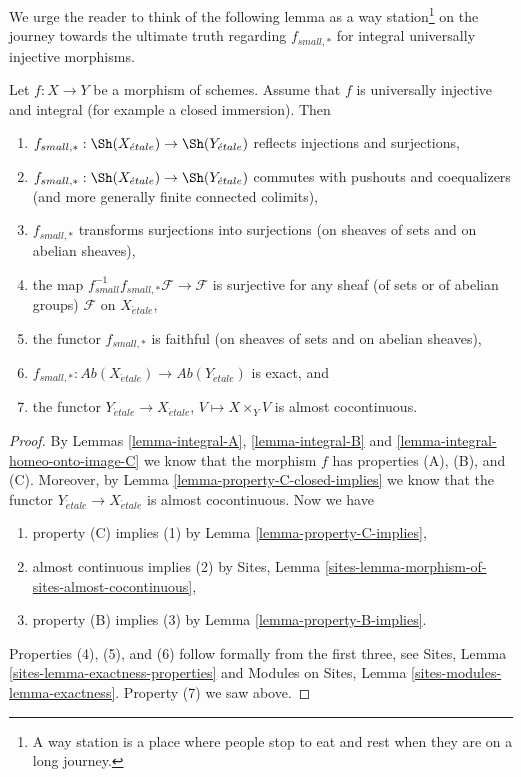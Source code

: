 \noindent
We urge the reader to think of the following lemma as a
way station\footnote{A way station is a place where people stop to eat
and rest when they are on a long journey.} on the journey towards the
ultimate truth regarding $f_{small, *}$ for integral universally injective
morphisms.

\begin{lemma}
\label{lemma-integral-universally-injective}
Let $f : X \to Y$ be a morphism of schemes. Assume that $f$ is
universally injective and integral (for example a closed immersion).
Then
\begin{enumerate}
\item
$f_{small, *} :
\Sh(X_{\acute{e}tale})
\to
\Sh(Y_{\acute{e}tale})$
reflects injections and surjections,
\item
$f_{small, *} :
\Sh(X_{\acute{e}tale})
\to
\Sh(Y_{\acute{e}tale})$
commutes with pushouts and coequalizers (and more generally
finite connected colimits),
\item $f_{small, *}$ transforms surjections into surjections (on sheaves
of sets and on abelian sheaves),
\item the map
$f_{small}^{-1}f_{small, *}\mathcal{F} \to \mathcal{F}$
is surjective for any sheaf (of sets or of abelian groups)
$\mathcal{F}$ on $X_{\acute{e}tale}$,
\item the functor $f_{small, *}$ is faithful (on sheaves of sets and
on abelian sheaves),
\item
$f_{small, *} :
\textit{Ab}(X_{\acute{e}tale})
\to
\textit{Ab}(Y_{\acute{e}tale})$
is exact, and
\item the functor
$Y_{\acute{e}tale} \to X_{\acute{e}tale}$, $V \mapsto X \times_Y V$ is
almost cocontinuous.
\end{enumerate}
\end{lemma}

\begin{proof}
By
Lemmas \ref{lemma-integral-A},
\ref{lemma-integral-B} and
\ref{lemma-integral-homeo-onto-image-C}
we know that the morphism $f$ has properties (A), (B), and (C).
Moreover, by
Lemma \ref{lemma-property-C-closed-implies}
we know that the functor $Y_{\acute{e}tale} \to X_{\acute{e}tale}$ is
almost cocontinuous. Now we have
\begin{enumerate}
\item property (C) implies (1) by
Lemma \ref{lemma-property-C-implies},
\item almost continuous implies (2) by
Sites, Lemma \ref{sites-lemma-morphism-of-sites-almost-cocontinuous},
\item property (B) implies (3) by
Lemma \ref{lemma-property-B-implies}.
\end{enumerate}
Properties (4), (5), and (6) follow formally from the first three, see
Sites, Lemma \ref{sites-lemma-exactness-properties}
and
Modules on Sites, Lemma \ref{sites-modules-lemma-exactness}.
Property (7) we saw above.
\end{proof}




